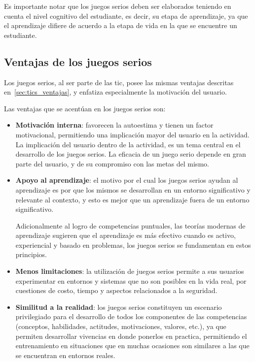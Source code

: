 Es importante notar que los juegos serios deben ser elaborados teniendo en cuenta el
nivel cognitivo del estudiante, es decir, su etapa de aprendizaje, ya que el
aprendizaje difiere de acuerdo a la etapa de vida en la que se encuentre un
estudiante\cite{education:games}.

\subsection{Ventajas de los juegos serios}

Los juegos serios, al ser parte de las \Gls{tic}, posee las
mismas ventajas descritas en~\ref{sec:tics_ventajas}, y enfatiza especialmente
la motivación del usuario.

Las ventajas que se acentúan en los juegos serios son:

\begin{itemize}

\item \textbf{Motivación interna}: favorecen la autoestima y tienen un factor
    motivacional\cite{guenaga2013serious}, permitiendo una implicación mayor del
    usuario en la actividad\cite{sg:aoverview}. La implicación del usuario
    dentro de la actividad, es un tema central en el desarrollo de los juegos
    serios\cite{charsky:2010}. La eficacia de un juego serio depende en gran
    parte del usuario, y de su compromiso con las metas del
    mismo\cite{sg:aoverview}.

\item \textbf{Apoyo al aprendizaje}: el motivo por el cual los juegos serios
    ayudan al aprendizaje es por que los mismos se desarrollan en un entorno
    significativo y relevante al contexto, y esto es mejor que un aprendizaje
    fuera de un entorno significativo\cite{sg:aoverview}.
    
   Adicionalmente al logro de competencias puntuales, las teorías modernas de
   aprendizaje sugieren que el aprendizaje es más efectivo cuando es activo,
   experiencial y basado en problemas, los juegos serios se fundamentan en estos
   principios\cite{guenaga2013serious}.

\item \textbf{Menos limitaciones}: la utilización de juegos serios permite a sus
    usuarios experimentar en entornos y sistemas que no son posibles en la vida
    real, por cuestiones de costo, tiempo y aspectos relacionados a la
    seguridad\cite{sg:aoverview}.

\item \textbf{Similitud a la realidad}: los juegos serios constituyen un
    escenario privilegiado para el desarrollo de todos los componentes de las
    competencias (conceptos, habilidades, actitudes, motivaciones, valores,
    etc.), ya que permiten desarrollar vivencias en donde ponerlos en practica,
    permitiendo el entrenamiento en situaciones que en muchas ocasiones son
    similares a las que se encuentran en entornos
    reales\cite{guenaga2013serious,sg:aoverview}.
    

\end{itemize}
